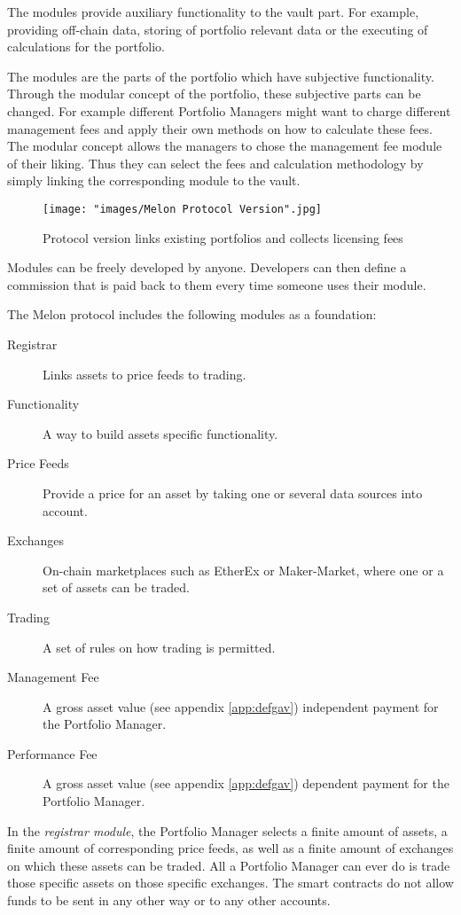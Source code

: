 \documentclass[9pt,oneside]{amsart}
\theoremstyle{plain}
\begin{document}
\begin{multicols}{2}
The modules provide auxiliary functionality to the vault part. For example, providing off-chain data, storing of portfolio relevant data or the executing of calculations for the portfolio.

The modules are the parts of the portfolio which have subjective functionality. Through the modular concept of the portfolio, these subjective parts can be changed. For example different Portfolio Managers might want to charge different management fees and apply their own methods on how to calculate these fees. The modular concept allows the managers to chose the management fee module of their liking. Thus they can select the fees and calculation methodology by simply linking the corresponding module to the vault.

\begin{figure*}[ht!]
	\centering
	\texttt{[image: "images/Melon Protocol Version".jpg]}
	\caption{Protocol version links existing portfolios and collects licensing fees \label{fig:protocolversion}}
\end{figure*}

Modules can be freely developed by anyone. Developers can then define a commission that is paid back to them every time someone uses their module.

The Melon protocol includes the following modules as a foundation:

\begin{description}
	\item[Registrar] Links assets to price feeds to trading.
	\item[Functionality] A way to build assets specific functionality.
	\item[Price Feeds] Provide a price for an asset by taking one or several data sources into account.    
	\item[Exchanges] On-chain marketplaces such as EtherEx\cite{etherex} or Maker-Market\cite{maker-market}, where one or a set of assets can be traded.
	\item[Trading] A set of rules on how trading is permitted.
	\item[Management Fee] A gross asset value (see appendix \ref{app:defgav}) independent payment for the Portfolio Manager.
	\item[Performance Fee] A gross asset value (see appendix \ref{app:defgav}) dependent payment for the Portfolio Manager.
\end{description}

In the \textit{registrar module}, the Portfolio Manager selects a finite amount of assets, a finite amount of corresponding price feeds, as well as a finite amount of exchanges on which these assets can be traded. All a Portfolio Manager can ever do is trade those specific assets on those specific exchanges. The smart contracts do not allow funds to be sent in any other way or to any other accounts. 


\end{multicols}
\end{document}
